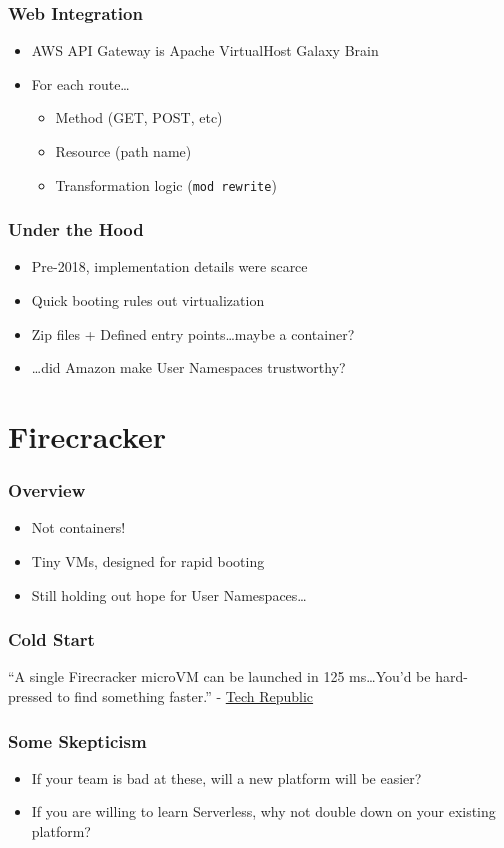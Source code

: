 \documentclass{beamer}
\begin{document}
\begin{frame}
	\frametitle{Web Integration}
	\begin{itemize}
		\item AWS API Gateway is Apache VirtualHost Galaxy Brain
		\pause \item For each route\ldots
			\begin{itemize}
				\pause \item Method (GET, POST, etc)
				\pause \item Resource (path name)
				\pause \item Transformation logic (\texttt{mod rewrite})
			\end{itemize}
	\end{itemize}
\end{frame}

\begin{frame}
	\frametitle{Under the Hood}
	\begin{itemize}
		\item Pre-2018, implementation details were scarce
		\pause \item Quick booting rules out virtualization
		\pause \item Zip files + Defined entry points\ldots maybe a container?
		\pause \item \ldots did Amazon make User Namespaces trustworthy?
	\end{itemize}
\end{frame}
 
\section{Firecracker}
\frame{\sectionpage}

\begin{frame}
	\frametitle{Overview}
	\begin{itemize}
		\item Not containers!
		\pause \item Tiny VMs, designed for rapid booting
		\pause \item Still holding out hope for User Namespaces\ldots
	\end{itemize}
\end{frame}

\begin{frame}
	\frametitle{Cold Start}
	``A single Firecracker microVM can be launched in \alert{125 ms}\ldots You'd be
	hard-pressed to find something faster.''
	- \href{https://www.techrepublic.com/article/aws-firecracker-10-things-every-tech-pro-should-know/}{Tech Republic}
\end{frame}

\begin{frame}
	\frametitle{Some Skepticism}
	\begin{itemize}
		\item If your team is bad at these, will a new platform will be easier?
		\pause \item If you are willing to learn Serverless, why not double down
			on your existing platform?
	\end{itemize}
\end{frame}
\end{document}
